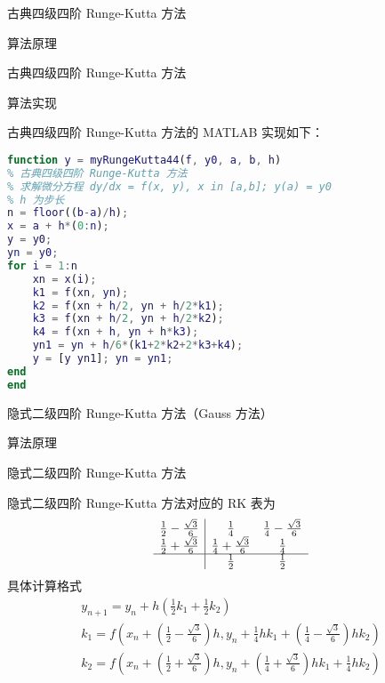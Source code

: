 \documentclass[a4paper]{article}
\begin{document}
\begin{multicols}{2}
\begin{section}{古典四级四阶 Runge-Kutta 方法}
\begin{subsection}{算法原理}
\begin{subsubsection}{古典四级四阶 Runge-Kutta 方法}
		\end{subsubsection}
		
	\end{subsection}
	
	\begin{subsection}{算法实现}
		
		古典四级四阶 Runge-Kutta 方法的 MATLAB 实现如下：
		
		\begin{lstlisting}[language=Matlab]
function y = myRungeKutta44(f, y0, a, b, h)
% 古典四级四阶 Runge-Kutta 方法
% 求解微分方程 dy/dx = f(x, y), x in [a,b]; y(a) = y0
% h 为步长
n = floor((b-a)/h);
x = a + h*(0:n); 
y = y0; 
yn = y0;
for i = 1:n
    xn = x(i);
    k1 = f(xn, yn);
    k2 = f(xn + h/2, yn + h/2*k1);
    k3 = f(xn + h/2, yn + h/2*k2);
    k4 = f(xn + h, yn + h*k3);
    yn1 = yn + h/6*(k1+2*k2+2*k3+k4);
    y = [y yn1]; yn = yn1;
end
end
		\end{lstlisting}
		
	\end{subsection}
	
\end{section}

\begin{section}{隐式二级四阶 Runge-Kutta 方法（Gauss 方法）}

	\begin{subsection}{算法原理}
		
		\begin{subsubsection}{隐式二级四阶 Runge-Kutta 方法}
			
			隐式二级四阶 Runge-Kutta 方法对应的 RK 表为 $$\begin{array}{c|cc}{\frac{1}{2}-\frac{\sqrt{3}}{6}} & {\frac{1}{4}} & {\frac{1}{4}-\frac{\sqrt{3}}{6}} \\ {\frac{1}{2}+\frac{\sqrt{3}}{6}} & {\frac{1}{4}+\frac{\sqrt{3}}{6}} & {\frac{1}{4}} \\ \hline & {\frac{1}{2}} & {\frac{1}{2}}\end{array}$$ 具体计算格式 $$\begin{array}{l}{y_{n+1}=y_{n}+h\left(\frac{1}{2} k_{1}+\frac{1}{2} k_{2}\right)} \\ {k_{1}=f\left(x_{n}+\left(\frac{1}{2}-\frac{\sqrt{3}}{6}\right) h, y_{n}+\frac{1}{4} h k_{1}+\left(\frac{1}{4}-\frac{\sqrt{3}}{6}\right) h k_{2}\right)} \\ {k_{2}=f\left(x_{n}+\left(\frac{1}{2}+\frac{\sqrt{3}}{6}\right) h, y_{n}+\left(\frac{1}{4}+\frac{\sqrt{3}}{6}\right) h k_{1}+\frac{1}{4} h k_{2}\right)}\end{array}$$
			

\end{subsubsection}
\end{subsection}
\end{section}
\end{multicols}
\end{document}
